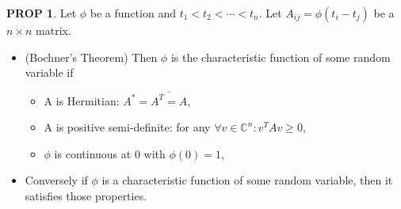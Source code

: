 \documentclass[hidelinks,11pt]{article}
\theoremstyle{definition}
\theoremstyle{dotles}
\theoremstyle{dotless}
\newtheorem{prop}{PROP}[section]
\theoremstyle{remark}
\begin{document}
\begin{prop}
Let $\phi$ be a function and $t_1<t_2<\cdots<t_n$. Let $A_{ij}=\phi(t_i-t_j)$ be a $n\times n$ matrix.\begin{itemize}
    \item \textup{(Bochner's Theorem)} Then $\phi$ is the characteristic function of some random variable if\begin{itemize}
        \item A is Hermitian: $A^*=\overline{A^T=A}$,
        \item A is positive semi-definite: for any $\forall v\in\mathbb{C}^n:v^TAv\geq0$,
        \item $\phi$ is continuous at 0 with $\phi(0)=1$,
    \end{itemize}
    \item Conversely if $\phi$ is a characteristic function of some random variable, then it satisfies those properties.
\end{itemize}
\end{prop}
\end{document}
